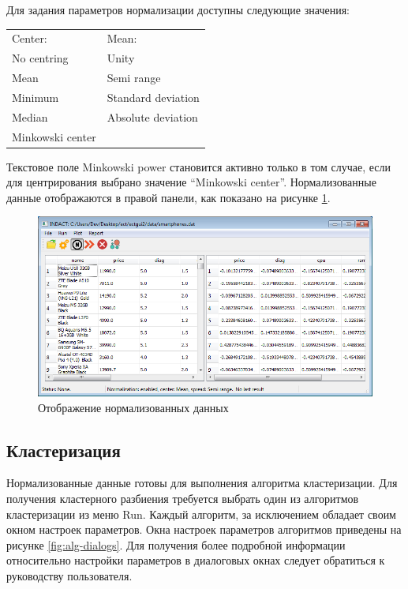 \documentclass[12pt]{diploma}
\begin{document}
	Для задания параметров нормализации доступны следующие значения:
	\begin{flushleft}
		\begin{tabular}{ l l }
			Center: & Mean: \\
			\tabitem No centring &	\tabitem Unity \\
			\tabitem Mean &	\tabitem Semi range \\
			\tabitem Minimum &	\tabitem Standard deviation \\
			\tabitem Median &	\tabitem Absolute deviation \\
			\tabitem Minkowski center &	 \\						
		\end{tabular}
	\end{flushleft}
	
	Текстовое поле Minkowski power становится активно только в том случае, если для центрирования выбрано значение ``Minkowski center''. Нормализованные данные отображаются в правой панели, как показано на рисунке \ref{fig:norm-data}.
	
	\begin{figure}[h!]
		\centering
		\includegraphics[width=0.8\linewidth]{img/main-gui.png}				
		\caption{Отображение нормализованных данных}
		\label{fig:norm-data}
	\end{figure}
	
	\subsection{Кластеризация}\label{subsec:clustering}
	Нормализованные данные готовы для выполнения алгоритма кластеризации. Для получения кластерного разбиения требуется выбрать один из алгоритмов кластеризации из меню Run. Каждый алгоритм, за исключением \dePDDP обладает своим окном настроек параметров. Окна настроек параметров алгоритмов приведены на рисунке \ref{fig:alg-dialogs}. Для получения более подробной информации относительно настройки параметров в диалоговых окнах следует обратиться к руководству пользователя.
	
\end{document}
